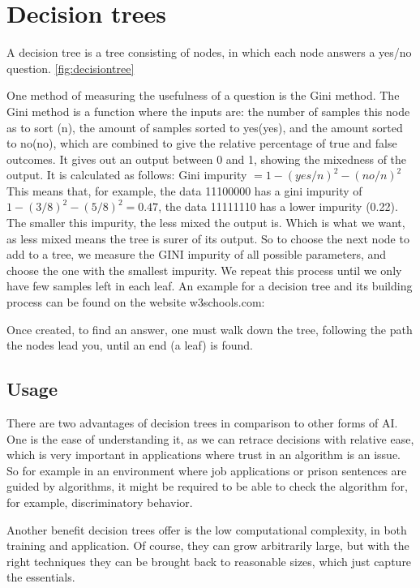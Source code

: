 \section{Decision trees}
\label{sec:decisionTrees}
A decision tree is a tree consisting of nodes, in which each node answers a yes/no question. \ref{fig:decisiontree}

One method of measuring the usefulness of a question is the Gini method.
The Gini method is a function where the inputs are: the number of samples this node as to sort (n), the amount of samples sorted to yes(yes), and the amount sorted to no(no), which are combined to give the relative percentage of true and false outcomes. It gives out an output between 0 and 1, showing the mixedness of the output.
It is calculated as follows: Gini impurity $= 1-(yes/n)^2-(no/n)^2$ 
This means that, for example, the data 11100000 has a gini impurity of $1-(3/8)^2-(5/8)^2=0.47$, the data 11111110 has a lower impurity (0.22).
The smaller this impurity, the less mixed the output is. Which is what we want, as less mixed means the tree is surer of its output. 
So to choose the next node to add to a tree, we measure the GINI impurity of all possible parameters, and choose the one with the smallest impurity. We repeat this process until we only have few samples left in each leaf. 
An example for a decision tree and its building process can be found on the website w3schools.com:
\cite{decisiontree}

Once created, to find an answer, one must walk down the tree, following the path the nodes lead you, until an end (a leaf) is found.

\subsection{Usage}
There are two advantages of decision trees in comparison to other forms of AI. One is the ease of understanding it, as we can retrace decisions with relative ease, which is very important in applications where trust in an algorithm is an issue. So for example in an environment where job applications or prison sentences are guided by algorithms, it might be required to be able to check the algorithm for, for example, discriminatory behavior.

Another benefit decision trees offer is the low computational complexity, in both training and application. Of course, they can grow arbitrarily large, but with the right techniques they can be brought back to reasonable sizes, which just capture the essentials.



